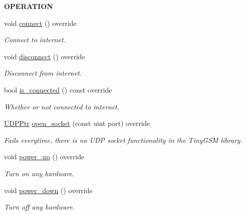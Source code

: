 \begin{Indent}{\bf O\+P\+E\+R\+A\+T\+I\+ON}\par
\begin{DoxyCompactItemize}
\item 
void \hyperlink{class_loom___l_t_e_ac1a5109706d827b394f350181a8f3698}{connect} () override
\begin{DoxyCompactList}\small\item\em Connect to internet. \end{DoxyCompactList}\item 
void \hyperlink{class_loom___l_t_e_a14b4c6a3cefe05144d3d8a3bee587188}{disconnect} () override
\begin{DoxyCompactList}\small\item\em Disconnect from internet. \end{DoxyCompactList}\item 
bool \hyperlink{class_loom___l_t_e_a38253137a5dbe6a069e75ca7aa9b872f}{is\+\_\+connected} () const override
\begin{DoxyCompactList}\small\item\em Whether or not connected to internet. \end{DoxyCompactList}\item 
\hyperlink{class_loom_internet_plat_a0b2cc742a6ac5f4f7054b75ea99b345c}{U\+D\+P\+Ptr} \hyperlink{class_loom___l_t_e_a414b0ca17f97103620c7058fb0cb98d2}{open\+\_\+socket} (const uint port) override
\begin{DoxyCompactList}\small\item\em Fails everytime, there is no U\+DP socket functionality in the Tiny\+G\+SM library. \end{DoxyCompactList}\item 
void \hyperlink{class_loom___l_t_e_a4c2a46142110aa917b0f30bc75c7fec1}{power\+\_\+up} () override
\begin{DoxyCompactList}\small\item\em Turn on any hardware. \end{DoxyCompactList}\item 
void \hyperlink{class_loom___l_t_e_a553ab68611ebae383e590ffa3e15a243}{power\+\_\+down} () override
\begin{DoxyCompactList}\small\item\em Turn off any hardware. \end{DoxyCompactList}\end{DoxyCompactItemize}
\end{Indent}
